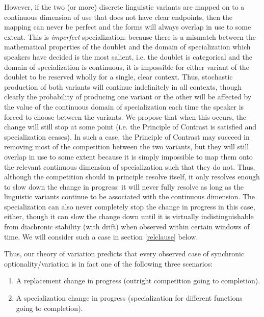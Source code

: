 However, if the two (or more) discrete linguistic variants are mapped on to a continuous dimension of use that does not have clear endpoints, then the mapping can never be perfect and the forms will always overlap in use to some extent.
This is \textsl{imperfect} specialization: because there is a mismatch between the mathematical properties of the doublet and the domain of specialization which speakers have decided is the most salient, i.e. the doublet is categorical and the domain of specialization is continuous, it is impossible for either variant of the doublet to be reserved wholly for a single, clear context.
Thus, stochastic production of both variants will continue indefinitely in all contexts, though clearly the probability of producing one variant or the other will be affected by the value of the continuous domain of specialization each time the speaker is forced to choose between the variants.
We propose that when this occurs, the change will still stop at some point (i.e. the Principle of Contrast is satisfied and specialization ceases).
In such a case, the Principle of Contrast may succeed in removing most of the competition between the two variants, but they will still overlap in use to some extent because it is simply impossible to map them onto the relevant continuous dimension of specialization such that they do not.
Thus, although the competition should in principle resolve itself, it only resolves enough to slow down the change in progress: it will never fully resolve as long as the linguistic variants continue to be associated with the continuous dimension.
The specialization can also never completely stop the change in progress in this case, either, though it can slow the change down until it is virtually indistinguishable from diachronic stability (with drift) when observed within certain windows of time.
We will consider such a case in section \ref{relclause} below.

Thus, our theory of variation predicts that every observed case of synchronic optionality/variation is in fact one of the following three scenarios:

\begin{enumerate}
			\item A replacement change in progress (outright competition going to completion).
			\item A specialization change in progress (specialization for different functions going to completion).
		\end{enumerate}


